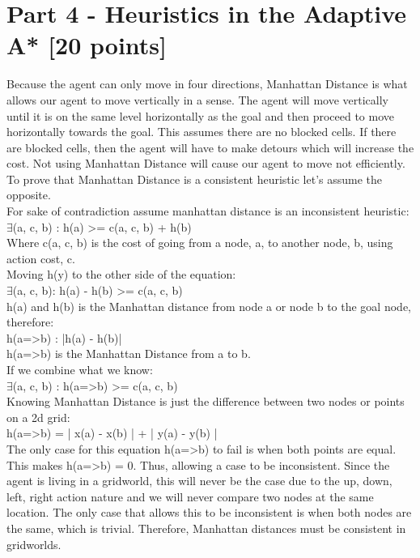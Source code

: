 \documentclass[a4paper]{article}
\theoremstyle{definition}
\theoremstyle{plain}
\begin{document}
\section*{Part 4 - Heuristics in the Adaptive A* [20 points]}
Because the agent can only move in four directions, Manhattan Distance is what allows our agent to move vertically in a sense. The agent will move vertically until it is on the same level horizontally as the goal and then proceed to move horizontally towards the goal. This assumes there are no blocked cells. If there are blocked cells, then the agent will have to make detours which will increase the cost. Not using Manhattan Distance will cause our agent to move not efficiently. To prove that Manhattan Distance is a consistent heuristic let's assume the opposite.\\For sake of contradiction assume manhattan distance is an inconsistent heuristic:\\
    $\exists$(a, c, b) : h(a) >= c(a, c, b) + h(b)\\
Where c(a, c, b) is the cost of going from a node, a, to another node, b, using action cost, c. \\
Moving h(y) to the other side of the equation: \\
    $\exists$(a, c, b): h(a) - h(b) >= c(a, c, b) \\
h(a) and h(b) is the Manhattan distance from node a or node b to the goal node, therefore:\\
	h(a=>b) : |h(a) - h(b)|\\
h(a=>b) is the Manhattan Distance from a to b. \\
If we combine what we know:\\
	$\exists$(a, c, b) : h(a=>b) >= c(a, c, b)\\
Knowing Manhattan Distance is just the difference between two nodes or points on a 2d grid:\\
	h(a=>b) = | x(a) - x(b) | + | y(a) - y(b) |\\
The only case for this equation h(a=>b) to fail is when both points are equal. This makes h(a=>b) = 0. Thus, allowing a case to be inconsistent. Since the agent is living in a gridworld, this will never be the case due to the up, down, left, right action nature and we will never compare two nodes at the same location. The only case that allows this to be inconsistent is when both nodes are the same, which is trivial. Therefore, Manhattan distances must be consistent in gridworlds. 
\\ \\
\end{document}
